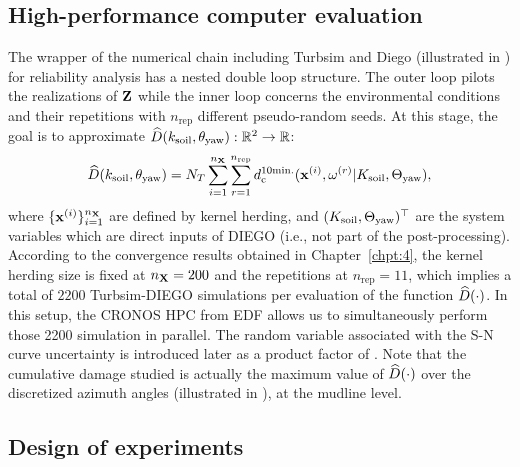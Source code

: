 \subsection{High-performance computer evaluation}
The wrapper of the numerical chain including Turbsim and Diego (illustrated in ) for reliability analysis has a nested double loop structure.  
The outer loop pilots the realizations of ${\bf Z}$ while the inner loop concerns the environmental conditions and their repetitions with $n_{\mathrm{rep}}$ different pseudo-random seeds. 
At this stage, the goal is to approximate $\widehat{D}(k_{\mathrm{soil}}, \theta_{\mathrm{yaw}}):\mathbb{R}^2 \rightarrow \mathbb{R}$: 
\begin{equation}
    \widehat{D}(k_{\mathrm{soil}}, \theta_{\mathrm{yaw}}) = N_T \sum_{i=1}^{n_{\bf X}} \sum_{r=1}^{n_{\mathrm{rep}}} d_{\mathrm{c}}^{10\mathrm{min.}}({\bf x}^{(i)}, \omega^{(r)} | K_{\mathrm{soil}}, \Theta_{\mathrm{yaw}}),
    \label{eq:hpc_cumulated_damage}
\end{equation}
where $\{{\bf x}^{(i)}\}_{i=1}^{n_{\bf X}}$ are defined by kernel herding, and $(K_{\mathrm{soil}}, \Theta_{\mathrm{yaw}})^\top$ are the system variables which are direct inputs of DIEGO (i.e., not part of the post-processing). 
According to the convergence results obtained in Chapter~\ref{chpt:4}, the kernel herding size is fixed at $n_{\bf X}=200$ and the repetitions at $n_{\mathrm{rep}}=11$, which implies a total of $2200$ Turbsim-DIEGO simulations per evaluation of the function $\widehat{D}(\cdot)$. 
In this setup, the CRONOS HPC from EDF allows us to simultaneously perform those 2200 simulation in parallel. 
The random variable associated with the S-N curve uncertainty is introduced later as a product factor of . 
Note that the cumulative damage studied is actually the maximum value of $\widehat{D}(\cdot)$ over the discretized azimuth angles (illustrated in ), at the mudline level. 


\subsection{Design of experiments}


